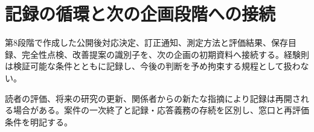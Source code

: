 \documentclass[a4paper,11pt]{article}
\begin{document}
\section{記録の循環と次の企画段階への接続}
\par 第8段階で作成した公開後対応決定、訂正通知、測定方法と評価結果、保存目録、完全性点検、改善提案の識別子を、次の企画の初期資料へ接続する。経験則は検証可能な条件とともに記録し、今後の判断を予め拘束する規程として扱わない。\par\medskip
\par 読者の評価、将来の研究の更新、関係者からの新たな指摘により記録は再開される場合がある。案件の一次終了と記録・応答義務の存続を区別し、窓口と再評価条件を明記する。\par\medskip
\end{document}
